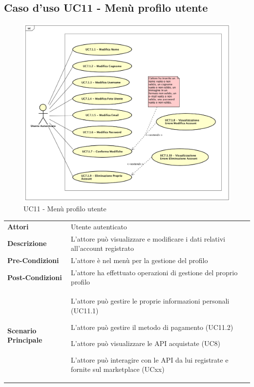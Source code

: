 \newpage
\subsection{Caso d'uso UC11 - Menù profilo utente}
\label{UC11}

\begin{figure}[ht]
	\centering
	\includegraphics[scale=0.45]{UML/UC7_1.png}
	\caption{UC11 - Menù profilo utente}
\end{figure}
\FloatBarrier
\begin{longtable}{ l | p{11cm}}
	\hline
	\rowcolor{Gray}
	 \multicolumn{2}{c}{UC11 - Menù profilo utente} \\
	 \hline
	 \textbf{Attori} & Utente autenticato  \\
	\textbf{Descrizione} & L’attore può visualizzare e modificare i dati relativi all'account registrato \\
	\textbf{Pre-Condizioni} & L’attore è nel menù per la gestione del profilo \\
	\textbf{Post-Condizioni} & L’attore ha effettuato operazioni di gestione del proprio profilo \\
	\textbf{Scenario Principale} & 
	\begin{enumerate*}[label=(\arabic*.),itemjoin={\newline}]
		\item L'attore può gestire le proprie informazioni personali (UC11.1)
		\item L'attore può gestire il metodo di pagamento (UC11.2)
		\item L'attore può visualizzare le API acquistate (UC8)
		\item L'attore può interagire con le API da lui registrate e fornite sul marketplace (UCxx)
	\end{enumerate*}\\
\end{longtable}

